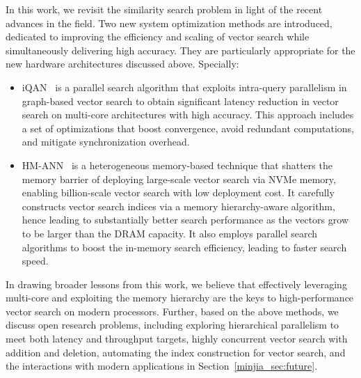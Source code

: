 In this work, we revisit the similarity search problem in light of the recent advances in the field. Two new system optimization methods are introduced, dedicated to improving the efficiency and scaling of vector search while simultaneously delivering high accuracy. They are particularly appropriate for the new hardware architectures discussed above. Specially:
\begin{itemize}
    \item iQAN~\cite{iqan} is a parallel search algorithm that exploits intra-query parallelism in graph-based vector search to obtain significant latency reduction in vector search on multi-core architectures with high accuracy. This approach includes a set of optimizations that boost convergence, avoid redundant computations, and mitigate synchronization overhead.
    \item HM-ANN~\cite{hm-ann} is a heterogeneous memory-based technique that shatters the memory barrier of deploying large-scale vector search via NVMe memory, enabling billion-scale vector search with low deployment cost. It carefully constructs vector search indices via a memory hierarchy-aware algorithm, hence leading to substantially better search performance as the vectors grow to be larger than the DRAM capacity. It also employs parallel search algorithms to boost the in-memory search efficiency, leading to faster search speed.    
\end{itemize} 

In drawing broader lessons from this work, we believe that effectively leveraging multi-core and exploiting the memory hierarchy are the keys to high-performance vector search on modern processors. Further, based on the above methods, we discuss open research problems, including exploring hierarchical parallelism to meet both latency and throughput targets, highly concurrent vector search with addition and deletion, automating the index construction for vector search, and the interactions with modern applications in Section~\ref{minjia_sec:future}. 






